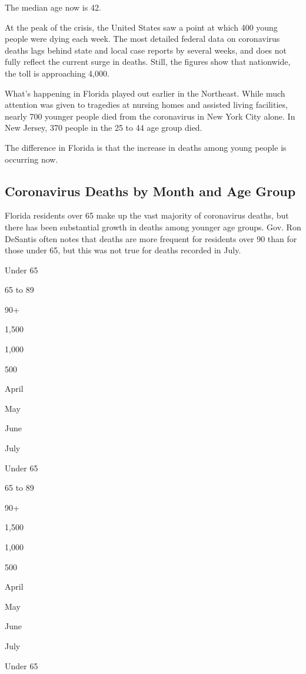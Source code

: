 The median age now is 42.

At the peak of the crisis, the United States saw a point at which 400
young people were dying each week. The most detailed federal data on
coronavirus deaths lags behind state and local case reports by several
weeks, and does not fully reflect the current surge in deaths. Still,
the figures show that nationwide, the toll is approaching 4,000.

What's happening in Florida played out earlier in the Northeast. While
much attention was given to tragedies at nursing homes and assisted
living facilities, nearly 700 younger people died from the coronavirus
in New York City alone. In New Jersey, 370 people in the 25 to 44 age
group died.

The difference in Florida is that the increase in deaths among young
people is occurring now.

\hypertarget{coronavirus-deaths-by-month-and-age-group}{%
\subsection{Coronavirus Deaths by Month and Age
Group}\label{coronavirus-deaths-by-month-and-age-group}}

Florida residents over 65 make up the vast majority of coronavirus
deaths, but there has been substantial growth in deaths among younger
age groups. Gov. Ron DeSantis often notes that deaths are more frequent
for residents over 90 than for those under 65, but this was not true for
deaths recorded in July.

Under 65

65 to 89

90+

1,500

1,000

500

April

May

June

July

Under 65

65 to 89

90+

1,500

1,000

500

April

May

June

July

Under 65

